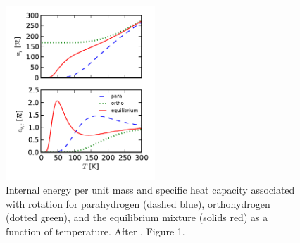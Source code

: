 \documentclass[apj]{emulateapj}
\newcommand{\delad}{\nabla_{\rm ad}}
\begin{document}



\begin{figure}[h]
\centering
\includegraphics[width=0.5\textwidth]{../../figs/ModelAtmospheres/RadSelfGravRealEOS/PaperFigs/ortho_para_energy.pdf}
\caption{Internal energy per unit mass and specific heat capacity associated with rotation for parahydrogen (dashed blue), orthohydrogen (dotted green), and the equilibrium mixture (solids red) as a function of temperature. After \citet{farkas35}, Figure 1.}
\label{fig:ucvr}
\end{figure}


\end{document}
